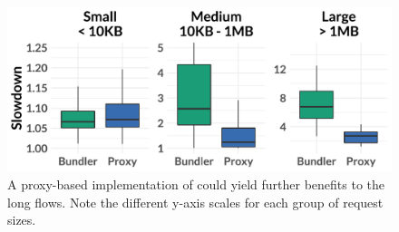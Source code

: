 \begin{figure}
    \centering
\begin{knitrout}
\color{fgcolor}
\includegraphics[width=\maxwidth]{figure/eval_proxy-1} 

\end{knitrout}
    \caption{A proxy-based implementation of \name could yield further benefits to the long flows. Note the different y-axis scales for each group of request sizes.}
    \label{fig:eval:proxy}
\end{figure}
